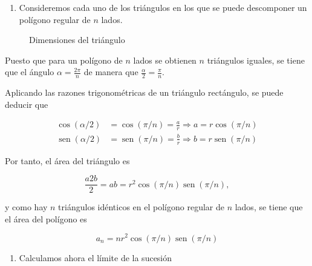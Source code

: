 \documentclass[
  a4paper,
]{scrreport}
\providecommand{\tightlist}{%
  \setlength{\itemsep}{0pt}\setlength{\parskip}{0pt}}\usepackage{longtable,booktabs,array}
\theoremstyle{definition}
\theoremstyle{remark}
\begin{document}
\begin{tcolorbox}[enhanced jigsaw, colframe=quarto-callout-tip-color-frame, opacitybacktitle=0.6, colbacktitle=quarto-callout-tip-color!10!white, rightrule=.15mm, toptitle=1mm, opacityback=0, title=\textcolor{quarto-callout-tip-color}{\faLightbulb}\hspace{0.5em}{Solución}, arc=.35mm, toprule=.15mm, breakable, bottomtitle=1mm, titlerule=0mm, bottomrule=.15mm, leftrule=.75mm, coltitle=black, left=2mm, colback=white]

\begin{enumerate}
\def\labelenumi{\alph{enumi}.}
\tightlist
\item
  Consideremos cada uno de los triángulos en los que se puede
  descomponer un polígono regular de \(n\) lados.
\end{enumerate}

\begin{figure}[H]

{\centering 



}

\caption{Dimensiones del triángulo}

\end{figure}

Puesto que para un polígono de \(n\) lados se obtienen \(n\) triángulos
iguales, se tiene que el ángulo \(\alpha=\frac{2\pi}{n}\) de manera que
\(\frac{\alpha}{2} = \frac{\pi}{n}\).

Aplicando las razones trigonométricas de un triángulo rectángulo, se
puede deducir que

\begin{align*}
\cos(\alpha/2) &= \cos(\pi/n) = \frac{a}{r} \Rightarrow a = r\cos(\pi/n)\\
\operatorname{sen}(\alpha/2) &= \operatorname{sen}(\pi/n) = \frac{b}{r} \Rightarrow b = r\operatorname{sen}(\pi/n)
\end{align*}

Por tanto, el área del triángulo es

\[
\frac{a2b}{2} = ab= r^2\cos(\pi/n)\operatorname{sen}(\pi/n),
\]

y como hay \(n\) triángulos idénticos en el polígono regular de \(n\)
lados, se tiene que el área del polígono es

\[
a_n  = n r^2\cos(\pi/n)\operatorname{sen}(\pi/n)
\]

\begin{enumerate}
\def\labelenumi{\alph{enumi}.}
\setcounter{enumi}{1}
\item
  Calculamos ahora el límite de la sucesión


\end{enumerate}
\end{tcolorbox}
\end{document}
